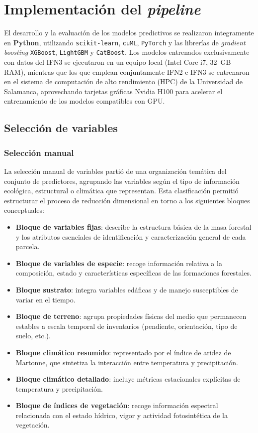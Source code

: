 \section{Implementación del \textit{pipeline}}

El desarrollo y la evaluación de los modelos predictivos se realizaron íntegramente en \textbf{Python}, utilizando \texttt{scikit-learn}, \texttt{cuML}, \texttt{PyTorch} y las librerías de \textit{gradient boosting} \texttt{XGBoost}, \texttt{LightGBM} y \texttt{CatBoost}. Los modelos entrenados exclusivamente con datos del IFN3 se ejecutaron en un equipo local (Intel Core i7, 32~GB RAM), mientras que los que emplean conjuntamente IFN2 e IFN3 se entrenaron en el sistema de computación de alto rendimiento (HPC) de la Universidad de Salamanca, aprovechando tarjetas gráficas Nvidia H100 para acelerar el entrenamiento de los modelos compatibles con GPU.

\subsection{Selección de variables}\label{sec:seleccion_variables}

\subsubsection{Selección manual}

La selección manual de variables partió de una organización temática del conjunto de
predictores, agrupando las variables según el tipo de información ecológica,
estructural o climática que representan. Esta clasificación permitió estructurar
el proceso de reducción dimensional en torno a los siguientes bloques conceptuales:

\begin{itemize}
    \item \textbf{Bloque de variables fijas}: describe la estructura básica de la
          masa forestal y los atributos esenciales de identificación y caracterización
          general de cada parcela.
    \item \textbf{Bloque de variables de especie}: recoge información relativa a la composición, estado y características específicas de las formaciones forestales.
    \item \textbf{Bloque sustrato}: integra variables edáficas y de manejo susceptibles de variar en el tiempo.
    \item \textbf{Bloque de terreno}: agrupa propiedades físicas del medio que permanecen estables a escala temporal de inventarios (pendiente, orientación, tipo de suelo, etc.).
    \item \textbf{Bloque climático resumido}: representado por el índice de aridez de Martonne, que sintetiza la interacción entre temperatura y precipitación.
    \item \textbf{Bloque climático detallado}: incluye métricas estacionales explícitas de temperatura y precipitación.
    \item \textbf{Bloque de índices de vegetación}: recoge información espectral relacionada con el estado hídrico, vigor y actividad fotosintética de la vegetación.
\end{itemize}

